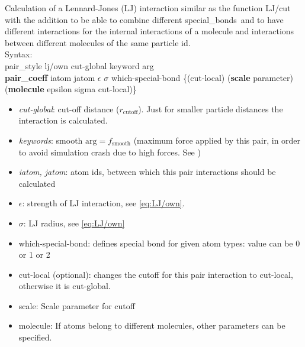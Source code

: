 Calculation of a Lennard-Jones (LJ) interaction similar as the function LJ/cut with the addition to be able to combine different \glqq special\_bonds\grqq\ and to have different interactions for the internal interactions of a molecule and interactions between different molecules of the same particle id.
\\[2ex]
Syntax:
\\[1ex]
pair\_style lj/own cut-global keyword arg
\\[2ex]
\textbf{pair\_coeff} iatom jatom $\epsilon$ $\sigma$ which-special-bond \{(cut-local) (\textbf{scale} parameter) (\textbf{molecule} epsilon sigma cut-local)\}

\begin{itemize}
\item \textit{cut-global}: cut-off distance ($r_\mathrm{cutoff}$). Just for smaller particle distances the interaction is calculated.
\item \textit{keywords}: smooth ${\mathrm{arg}} = f_{\mathrm{smooth}}$ (maximum force applied by this pair, in order to avoid simulation crash due to high forces. See )
\item \textit{iatom, jatom}: atom ids, between which this pair interactions should be calculated
\item $\epsilon$: strength of LJ interaction, see \cref{eq:LJ/own}.
\item $\sigma$: LJ radius, see \cref{eq:LJ/own}
\item which-special-bond: defines special bond for given atom types: value can be 0 or 1 or 2
\item cut-local (optional): changes the cutoff for this pair interaction to cut-local, otherwise it is cut-global.
\item scale: Scale parameter for cutoff
\item molecule: If atoms belong to different molecules, other parameters can be specified.
\end{itemize}

